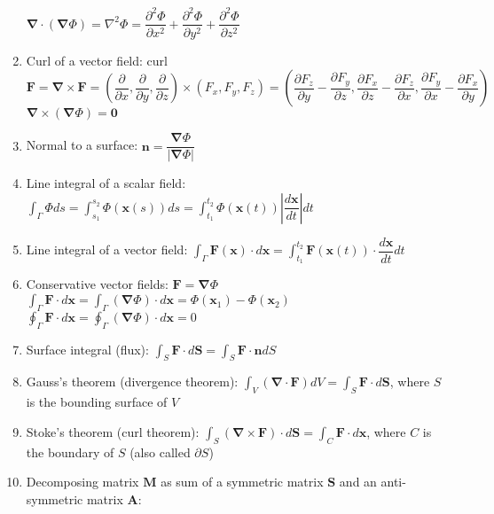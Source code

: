 \documentclass[fleqn]{article}
\begin{document}
\begin{enumerate}
        $\bm{\nabla}\cdot(\bm{\nabla}\Phi)=\nabla^2\Phi=\dfrac{\partial^2\Phi}{\partial x^2}+\dfrac{\partial^2\Phi}{\partial y^2}+\dfrac{\partial^2\Phi}{\partial z^2}$
    \item Curl of a vector field:\smallbreak
        curl $\bm{F}=\bm{\nabla}\times\bm{F}=\left(\dfrac{\partial}{\partial x},\dfrac{\partial}{\partial y},\dfrac{\partial}{\partial z}\right)\times(F_x,F_y,F_z)=\left(\dfrac{\partial F_z}{\partial y}-\dfrac{\partial F_y}{\partial z},\dfrac{\partial F_x}{\partial z}-\dfrac{\partial F_z}{\partial x},\dfrac{\partial F_y}{\partial x}-\dfrac{\partial F_x}{\partial y}\right)$\\
        $\bm{\nabla}\times(\bm{\nabla}\Phi)=\bm{0}$
    \item Normal to a surface:\smallbreak
        $\bm{n}=\dfrac{\bm{\nabla}\Phi}{|\bm{\nabla}\Phi|}$
    \item Line integral of a scalar field:\smallbreak
        $\displaystyle\int_\Gamma\Phi ds=\displaystyle\int_{s_1}^{s_2}\Phi(\bm{x}(s))ds=\displaystyle\int_{t_1}^{t_2}\Phi(\bm{x}(t))\left|\dfrac{d\bm{x}}{dt}\right|dt$
    \item Line integral of a vector field:\smallbreak
        $\displaystyle\int_\Gamma\bm{F}(\bm{x})\cdot d\bm{x}=\displaystyle\int_{t_1}^{t_2}\bm{F}(\bm{x}(t))\cdot\dfrac{d\bm{x}}{dt}dt$
    \item Conservative vector fields: $\bm{F}=\bm{\nabla}\Phi$\smallbreak
        $\displaystyle\int_\Gamma\bm{F}\cdot d\bm{x}=\displaystyle\int_\Gamma(\bm{\nabla}\Phi)\cdot d\bm{x}=\Phi(\bm{x}_1)-\Phi(\bm{x}_2)$\smallbreak
        $\displaystyle\oint_\Gamma\bm{F}\cdot d\bm{x}=\displaystyle\oint_\Gamma(\bm{\nabla}\Phi)\cdot d\bm{x}=0$
    \item Surface integral (flux):\smallbreak
        $\displaystyle\int_S\bm{F}\cdot d\bm{S}=\displaystyle\int_S\bm{F}\cdot\bm{n}dS$
    \item Gauss's theorem (divergence theorem):\smallbreak
        $\displaystyle\int_V(\bm{\nabla}\cdot\bm{F})dV=\displaystyle\int_S\bm{F}\cdot d\bm{S}$, where $S$ is the bounding surface of $V$
    \item Stoke's theorem (curl theorem):\smallbreak
        $\displaystyle\int_S(\bm{\nabla}\times\bm{F})\cdot d\bm{S}=\displaystyle\int_C\bm{F}\cdot d\bm{x}$, where $C$ is the boundary of $S$ (also called $\partial S$)
    \newpage
    \item Decomposing matrix $\bm{M}$ as sum of a symmetric matrix $\bm{S}$ and an anti-symmetric matrix $\bm{A}$: \\

\end{enumerate}
\end{document}
